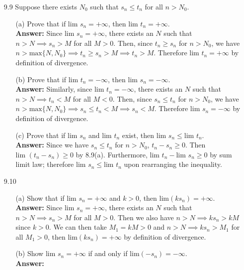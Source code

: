 \documentclass{article}
\begin{document}
\begin{itemize}
      \item [9.9] Suppose there exists $N_0$ such that $s_n\leq t_n$ for all $n>N_0$.
            \begin{itemize}
                  \item [(a)] Prove that if $\text{lim }s_n=+\infty$, then $\text{lim }t_n=+\infty$.\\
                        \textbf{Answer: } Since $\text{lim }s_n=+\infty$, there exists an $N$ such that $n>N\implies s_n>M$ for all $M>0$. Then, since $t_n\geq s_n$ for $n>N_0$, we have $n>\text{max}\{N,N_0\}\implies t_n\geq s_n>M\implies t_n>M$. Therefore $\text{lim }t_n=+\infty$ by definition of divergence.
                  \item [(b)] Prove that if $\text{lim }t_n=-\infty$, then $\text{lim }s_n=-\infty$.\\
                        \textbf{Answer: } Similarly, since $\text{lim }t_n=-\infty$, there exists an $N$ such that $n>N\implies t_n<M$ for all $M<0$. Then, since $s_n\leq t_n$ for $n>N_0$, we have $n>\text{max}\{N,N_0\}\implies s_n\leq t_n<M\implies s_n<M$. Therefore $\text{lim }s_n=-\infty$ by definition of divergence.
                  \item [(c)] Prove that if $\text{lim }s_n$ and $\text{lim }t_n$ exist, then $\text{lim }s_n\leq\text{lim }t_n$.\\
                        \textbf{Answer: } Since we have $s_n\leq t_n$ for $n>N_0$, $t_n-s_n\geq 0$. Then $\text{lim }(t_n-s_n)\geq 0$ by 8.9(a). Furthermore, $\text{lim }t_n-\text{lim }s_n\geq 0$ by sum limit law; therefore $\text{lim }s_n\leq\text{lim }t_n$ upon rearranging the inequality.
            \end{itemize}
      \item [9.10]
            \begin{itemize}
                  \item [(a)] Show that if $\text{lim }s_n=+\infty$ and $k>0$, then lim$(ks_n)=+\infty$.\\
                        \textbf{Answer: } Since $\text{lim }s_n=+\infty$, there exists an $N$ such that $n>N\implies s_n>M$ for all $M>0$. Then we also have $n>N\implies ks_n>kM$ since $k>0$. We can then take $M_1=kM>0$ and $n>N\implies ks_n>M_1$ for all $M_1>0$, then $\text{lim}(ks_n)=+\infty$ by definition of divergence.
                  \item [(b)] Show $\text{lim }s_n=+\infty$ if and only if lim$(-s_n)=-\infty$.\\
                        \textbf{Answer: }

\end{itemize}
\end{itemize}
\end{document}
